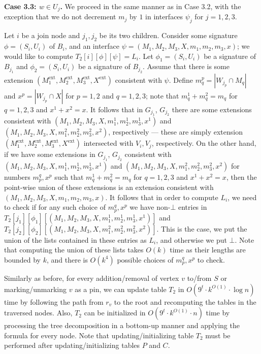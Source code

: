 \documentclass[a4paper,11pt]{article}
\theoremstyle{definition}
\theoremstyle{remark}
\newcommand{\ext}{\textrm{ext}}
\begin{document}
\vskip 0.1cm {\bf{Case 3.3: $w\in U_j$.}} We proceed in the same manner
as in Case 3.2, with the exception that we do not decrement $m_j$ by
$1$ in interfaces $\psi_j$ for $j=1,2,3$.

\vskip 0.3cm

 Let $i$ be a join node and
$j_1,j_2$ be its two children.  Consider some signature
$\phi=(S_i,U_i)$ of $B_i$, and an interface
$\psi=(M_1,M_2,M_3,X,m_1,m_2,m_3,x)$; we would like to compute
$T_2[i][\phi][\psi]=L_i$.  Let $\phi_1=(S_i,U_i)$ be a signature of
$B_{j_1}$ and $\phi_2=(S_i,U_i)$ be a signature of $B_{j_2}$.  Assume
that there is some extension $(M^{\ext}_1, M^{\ext}_2, M^{\ext}_3,
X^{\ext})$ consistent with $\psi$.  Define $m^p_q=|W_{j_p}\cap M_q|$
and $x^p=|W_{j_p}\cap X|$ for $p=1,2$ and $q=1,2,3$; note that
$m^1_q+m^2_q=m_q$ for $q=1,2,3$ and $x^1+x^2=x$.  It follows that in
$G_{j_1}$, $G_{j_2}$ there are some extensions consistent with
$(M_1,M_2,M_3,X,m^1_1,m^1_2,m^1_3,x^1)$ and
$(M_1,M_2,M_3,X,m^2_1,m^2_2,m^2_3,x^2)$, respectively --- these are
simply extension $(M^{\ext}_1, M^{\ext}_2, M^{\ext}_3, X^{\ext})$
intersected with $V_i,V_j$, respectively.  On the other hand, if we
have some extensions in $G_{j_1}$, $G_{j_2}$ consistent with
$(M_1,M_2,M_3,X,m^1_1,m^1_2,m^1_3,x^1)$ and
$(M_1,M_2,M_3,X,m^2_1,m^2_2,m^2_3,x^2)$ for numbers $m^q_p,x^p$ such
that $m^1_q+m^2_q=m_q$ for $q=1,2,3$ and $x^1+x^2=x$, then the
point-wise union of these extensions is an extension consistent with
$(M_1,M_2,M_3,X,m_1,m_2,m_3,x)$.  It follows that in order to compute
$L_i$, we need to check if for any such choice of $m^q_p,x^p$ we have
non-$\bot$ entries in
$T_2[j_1][\phi_1][(M_1,M_2,M_3,X,m^1_1,m^1_2,m^1_3,x^1)]$ and
$T_2[j_2][\phi_2][(M_1,M_2,M_3,X,m^2_1,m^2_2,m^2_3,x^2)]$.  This is
the case, we put the union of the lists contained in these entries as
$L_i$, and otherwise we put $\bot$.  Note that computing the union of
these lists takes $O(k)$ time as their lengths are bounded by $k$, and
there is $O(k^4)$ possible choices of $m^q_p,x^p$ to check.

\vskip 0.3cm

Similarly as before, for every addition/removal of vertex $v$ to/from
$S$ or marking/unmarking $v$ as a pin, we can update table $T_2$ in
$O(9^t\cdot k^{O(1)}\cdot \log n)$ time by following the path from
$r_v$ to the root and recomputing the tables in the traversed nodes.
Also, $T_2$ can be initialized in $O(9^t\cdot k^{O(1)}\cdot n)$ time
by processing the tree decomposition in a bottom-up manner and
applying the formula for every node.  Note that updating/initializing
table $T_2$ must be performed after updating/initializing tables $P$
and $C$.
\end{document}
